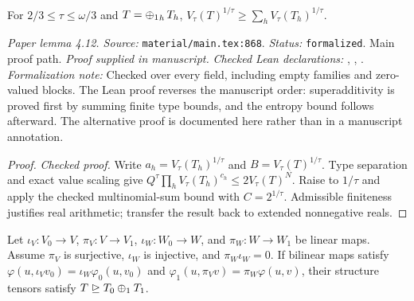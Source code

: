 \renewcommand{\thetheorem}{4.12}
\begin{lemma}
\label{lem:value-diamondsum}
\manuscriptproof
{}
\leanok
For $2/3\le\tau\le\omega/3$ and $T=\mathop{\mathbin{\oplus_1}}_hT_h$, $V_\tau(T)^{1/\tau}\ge\sum_hV_\tau(T_h)^{1/\tau}$.
\end{lemma}

\noindent\textit{Paper lemma 4.12. Source:} \texttt{material/main.tex:868}.
\textit{Status:} \texttt{formalized}. Main proof path.
\textit{Proof supplied in manuscript.}
\textit{Checked Lean declarations:} , , .
\textit{Formalization note:} Checked over every field, including empty families and zero-valued blocks. The Lean proof reverses the manuscript order: superadditivity is proved first by summing finite type bounds, and the entropy bound follows afterward. The alternative proof is documented here rather than in a manuscript annotation.

\begin{proof}
\leanok
{}
\textit{Checked proof.} Write $a_h=V_\tau(T_h)^{1/\tau}$ and $B=V_\tau(T)^{1/\tau}$. Type separation and exact value scaling give $Q^\tau\prod_hV_\tau(T_h)^{c_h}\le2V_\tau(T)^N$. Raise to $1/\tau$ and apply the checked multinomial-sum bound with $C=2^{1/\tau}$. Admissible finiteness justifies real arithmetic; transfer the result back to extended nonnegative reals.
\end{proof}

\renewcommand{\thetheorem}{5.1}
\begin{lemma}
\label{lem:degeneration-sequences}
\manuscriptproof
{}
\leanok
Let $\iota_V:V_0\to V$, $\pi_V:V\to V_1$, $\iota_W:W_0\to W$, and $\pi_W:W\to W_1$ be linear maps. Assume $\pi_V$ is surjective, $\iota_W$ is injective, and $\pi_W\iota_W=0$. If bilinear maps satisfy $\varphi(u,\iota_Vv_0)=\iota_W\varphi_0(u,v_0)$ and $\varphi_1(u,\pi_Vv)=\pi_W\varphi(u,v)$, their structure tensors satisfy $T\trianglerighteq T_0\mathbin{\oplus_1} T_1$.
\end{lemma}

